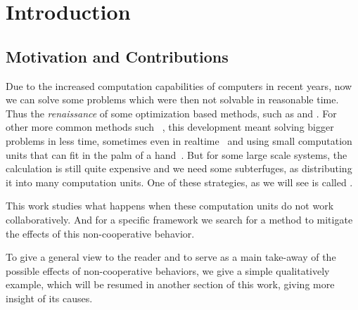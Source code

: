 \documentclass[../main.tex]{subfiles}
\begin{document}
\chapter{Introduction}\label{cha:introduction}

\section{Motivation and Contributions}
Due to the increased computation capabilities of computers in recent years,
now we can solve some problems which were then not solvable in reasonable time.
Thus the \emph{renaissance} of some optimization based methods, such as  and .
For other more common methods such \mpc~\cite{GarciaEtAl1989}, this development meant solving bigger problems in less time, sometimes even in realtime~ and using small computation units that can fit in the palm of a hand~\cite{BanguraMahony2014}.
But for some large scale systems, the calculation is still quite expensive and we need some subterfuges, as distributing it into many computation units.
One of these strategies, as we will see is called \dmpc.

This work studies what happens when these computation units do not work collaboratively.
And for a specific \dmpc framework we search for a method to mitigate the effects of this non-cooperative behavior.

To give a general view to the reader and to serve as a main take-away of the possible effects of non-cooperative behaviors, we give a simple qualitatively example, which will be resumed in another section of this work, giving more insight of its causes.
\end{document}
